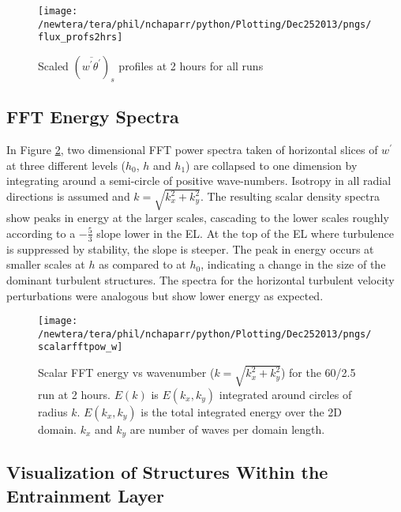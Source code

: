 \begin{figure}[htbp]
    \centering
    \texttt{[image: /newtera/tera/phil/nchaparr/python/Plotting/Dec252013/pngs/flux\_profs2hrs]}
    \caption{Scaled $(\overline{w^{'}\theta^{'}})_{s}$ profiles at 2 hours for all runs}
    \label{fig:fluxprofs2hrs}   %
\end{figure}

\clearpage

\subsection{FFT Energy Spectra}
\FloatBarrier

In Figure \ref{fig:scalarfftw602point5}, two dimensional \acs{FFT} power spectra taken of horizontal slices of $w^{\prime}$ at three different levels ($h_{0}$, $h$ and $h_{1}$) are collapsed to one dimension by integrating around a semi-circle of positive wave-numbers.
Isotropy in all radial directions is assumed and $k = \sqrt{k_{x}^{2} + k_{y}^{2}}$.  The resulting scalar density spectra show peaks in energy at the larger scales, cascading to the lower scales roughly according to a $-\frac{5}{3}$ slope lower in the \acs{EL}.  At
the top of the \acs{EL} where turbulence is suppressed by stability, the slope is steeper.  The peak in energy occurs at smaller scales
at $h$ as compared to at $h_{0}$, indicating a change in the size of the dominant turbulent structures. The spectra for the horizontal
turbulent velocity perturbations were analogous but show lower energy as expected.\\

\begin{figure}[htbp]
    \centering
    \texttt{[image: /newtera/tera/phil/nchaparr/python/Plotting/Dec252013/pngs/scalarfftpow\_w]}
    \caption[\acs{FFT} energy spectra of $w^{'}$]{Scalar FFT  energy vs wavenumber ($k = \sqrt{k_{x}^{2}+k_{y}^{2}}$) for the 60/2.5 run
at 2 hours.  $E(k)$ is $E(k_{x}, k_{y})$ integrated around circles of radius $k$.  
   $E(k_{x}, k_{y})$ is the total integrated energy over the 2D domain.  
   $k_{x}$ and $k_{y}$ are number of waves per domain length.}
   \label{fig:scalarfftw602point5}   %
\end{figure}


\clearpage

\subsection{Visualization of Structures Within the Entrainment Layer}
\FloatBarrier

